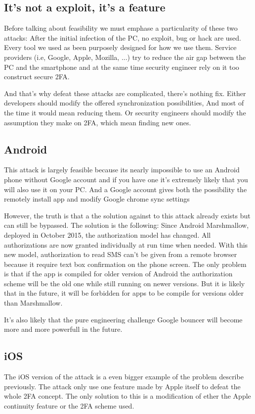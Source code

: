 \documentclass[11pt, a4paper,twocolumn]{article}
\begin{document}
\subsection{It's not a exploit, it's a feature}
Before talking about feasibility we must emphase a particularity of these two attacks: After the initial infection of the PC, no exploit, bug or hack are used. Every tool we used as been purposely designed for how we use them. Service providers (i.e, Google, Apple, Mozilla, ...) try to reduce the air gap between the PC and the smartphone and at the same time security engineer rely on it too construct secure 2FA.

And that's why defeat  these attacks are complicated, there's nothing fix. Either developers should modify the offered synchronization possibilities, And most of the time it would mean reducing them. Or security engineers should modify the assumption they make on 2FA, which mean finding new ones. 
\subsection{Android}

This attack is largely feasible because its nearly impossible to use an Android phone without Google account and if you have one it's extremely likely that you will also use it on your PC. And a Google account gives both the possibility the remotely install app and modify Google chrome sync settings

However, the truth is that a the solution against to this attack already exists but can still be bypassed. The solution is the following: Since Android Marshmallow, deployed in October 2015, the authorization model has changed. All authorizations are now granted individually at run time when needed. With this new model, authorization to read SMS can't be given from a remote browser because  it require text box confirmation on the phone screen. The only problem is that if the app is compiled for older version of Android the authorization scheme will be the old one while still running on newer versions. But it is likely that in the future, it will be forbidden for apps to be compile for versions older than Marshmallow.

It's also likely that the pure engineering challenge Google bouncer will become more and more powerfull in the future. 

\subsection{iOS}
The iOS version of the attack is a even bigger example of the problem describe previously. The attack only use one feature made by Apple itself to defeat the whole 2FA concept. The only solution to this is a modification of ether the Apple continuity feature or the 2FA scheme used. 
\end{document}
